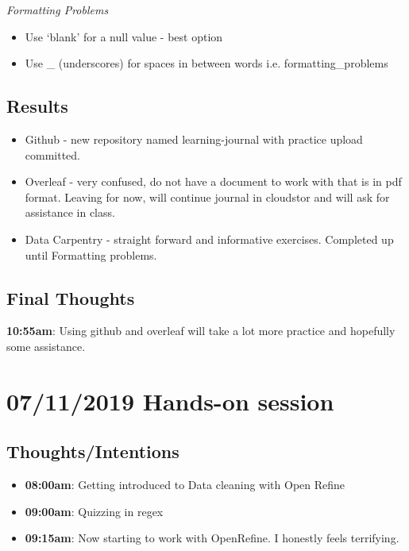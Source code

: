 \documentclass{article}
\begin{document}
\textit{Formatting Problems}

\begin{itemize}
\item Use ‘blank’ for a null value - best option
\item Use _ (underscores) for spaces in between words i.e. formatting_problems
\end{itemize}\subsection{Results}

\begin{itemize}
\item Github - new repository named learning-journal with practice upload committed. 
\item Overleaf - very confused, do not have a document to work with that is in pdf format. Leaving for now, will continue journal in cloudstor and will ask for assistance in class. 
\item Data Carpentry - straight forward and informative exercises. Completed up until Formatting problems.
\end{itemize}

\subsection{Final Thoughts}

\textbf{10:55am}: Using github and overleaf will take a lot more practice and hopefully some assistance.


\section{07/11/2019 Hands-on session}

\subsection{Thoughts/Intentions}

\begin{itemize}
\item \textbf{08:00am}: Getting introduced to Data cleaning with Open Refine
\item \textbf{09:00am}: Quizzing in regex
\item \textbf{09:15am}: Now starting to work with OpenRefine. I honestly feels terrifying.

\end{itemize}
\end{document}
